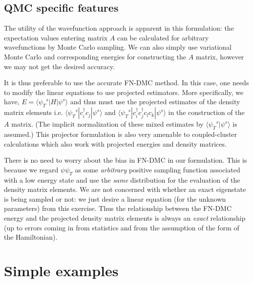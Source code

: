 \documentclass[prl,12pt,onecolumn,nofootinbib,notitlepage,english,superscriptaddress]{revtex4-1}
\newcommand{\HJC}[1]{{\color{RED}{\bf HJC: #1}}}
\begin{document}
\subsection{QMC specific features}
\HJC{Till this point perfectly general... QMC helps.... etc etc}
The utility of the wavefunction approach is apparent in this 
formulation: the expectation values entering matrix $A$ 
can be calculated for arbitrary wavefunctions by Monte Carlo sampling.
We can also simply use variational Monte Carlo and corresponding energies
for constructing the $A$ matrix, however we may not get the desired accuracy. 

\HJC{QMC specific}
It is thus preferable to use the accurate FN-DMC method. In this case, one needs to modify the linear equations 
to use projected estimators. More specifically, we have, $E= \langle {\psi_T}^{s}| H | {\psi}^s \rangle$ 
and thus must use the projected estimates of the density matrix elements i.e. 
$\langle {\psi_T}^s | c_i^{\dagger} c_j | {\psi}^s \rangle$ and $\langle {\psi_T}^s| c_i^{\dagger}c_j^{\dagger} c_l c_k | {\psi}^s \rangle$ 
in the construction of the $A$ matrix. (The implicit normalization of these 
mixed estimates by $\langle {\psi_T}^s | \psi^{s} \rangle$ is assumed.) 
This projector formulation is also very amenable to 
coupled-cluster calculations which also work with projected energies 
and density matrices.

\HJC{QMC specific}
There is no need to worry about the bias in FN-DMC in our formulation. 
This is because we regard $\psi \psi_T$ as some \emph{arbitrary} positive sampling function 
associated with a low energy state and use the \emph{same} distribution for the 
evaluation of the density matrix elements. We are not concerned with whether 
an exact eigenstate is being sampled or not: we just desire a linear equation 
(for the unknown parameters) from this exercise. Thus the relationship between the FN-DMC energy 
and the projected density matrix elements is always an \emph{exact} relationship 
(up to errors coming in from statistics and from the 
assumption of the form of the Hamiltonian). 



\section{Simple examples}
\HJC{Choosing the optimal one body space/ Dual optimization of Hamiltonian parameters and basis sets}
\HJC{Simple examples - lattice to lattice downfolding - Three to One band model and the "effective" d orbitals}
\HJC{Notes on 3 band - copy pasted from pdf, tex file missing ?????}
\end{document}
